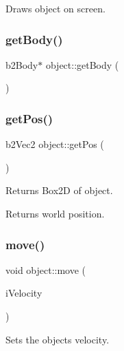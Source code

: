 Draws object on screen. 

\mbox{\label{classobject_ae2e614e0e6af97805323193da7a1e7ff}} 
\subsubsection{\texorpdfstring{get\+Body()}{getBody()}}
{\footnotesize\ttfamily b2\+Body$\ast$ object\+::get\+Body (\begin{DoxyParamCaption}{ }\end{DoxyParamCaption})\hspace{0.3cm}{\ttfamily [inline]}}

\mbox{\label{classobject_a505665c0df5c44d5dfc77881fe5d95a4}} 
\subsubsection{\texorpdfstring{get\+Pos()}{getPos()}}
{\footnotesize\ttfamily b2\+Vec2 object\+::get\+Pos (\begin{DoxyParamCaption}{ }\end{DoxyParamCaption})}



Returns Box2D of object. 

Returns world position. \mbox{\label{classobject_a74da589c4536cacfd76fa230a4dbee9e}} 
\subsubsection{\texorpdfstring{move()}{move()}}
{\footnotesize\ttfamily void object\+::move (\begin{DoxyParamCaption}\item[{b2\+Vec2 \&}]{i\+Velocity }\end{DoxyParamCaption})}



Sets the object\textquotesingle{}s velocity. 

\mbox{\label{classobject_a872e3c1ff75e786a58389852aad28a65}} 
